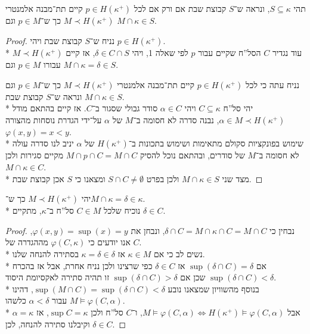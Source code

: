 \question{}
תהי $S \subseteq \kappa$, ונראה ש־$S$ קבוצת שבת אם ורק אם לכל $p \in H(\kappa^+)$ קיים תת־מבנה אלמנטרי $M \prec H(\kappa^+)$ כך ש־$p \in M$ וגם $M \cap \kappa \in S$.
\begin{proof}
	נניח ש־$S$ קבוצת שבת ויהי $p \in H(\kappa^+)$. \\*
	עוד נגדיר $C$ הסל''ח שקיים עבור $p$ לפי שאלה 1, ויהי $\delta \in C \cap S$, אז קיים $M \prec H(\kappa^+)$ עבורו $p \in M$ וגם $M \cap \kappa = \delta \in S$.

	נניח עתה כי לכל $p \in H(\kappa^+)$ קיים תת־מבנה אלמנטרי $M \prec H(\kappa^+)$ כך ש־$p \in M$ וגם $M \cap \kappa \in S$ ונראה ש־$S$ קבוצת שבת. \\*
	יהי סל''ח $C \subseteq \kappa$ ויהי $\alpha \in C$ סודר גבולי שסגור ב־$C$. אז קיים בהתאם מודל $\alpha \in M \prec H(\kappa^+)$, נבנה סדרה לא חסומה ב־$M$ של $\alpha$ על־ידי הגדרת נוסחות מהצורה $\varphi(x, y) = x < y$. \\*
	שימוש בפונקציות סקולם מתאימות ושימוש בתכונות ב־$H(\kappa^+)$ של $\alpha$ יניב לנו סדרה עולה לא חסומה ב־$M$ של סודרים, ובהתאם נוכל להסיק $M \cap p \cap C = M \cap C$ מקיים סגירות ולכן $M \cap \kappa \in C$. \\*
	מצד שני $M \cap \kappa \in S$ ולכן בפרט $S \cap C \ne \emptyset$ ומצאנו כי $S$ אכן קבוצת שבת.

\end{proof}

\question{}
יהי $M \prec H(\kappa^+)$ כך ש־$M \cap \kappa = \delta \in \kappa$. \\*
נוכיח שלכל $C \in M$ סל''ח ב־$\kappa$, מתקיים $\delta \in C$.
\begin{proof}
	נבחין כי $\delta \cap C = M \cap \kappa \cap C = M \cap C$, ונבחן את $\varphi(x, y) = \sup(x) = y$, אנו יודעים כי $\varphi(C, \kappa)$ מההגדרה של $C$. \\*
	נשים לב כי אם $\kappa \in M$ אז $\kappa = \delta \in \delta$ בסתירה להנחה שלנו. \\*
	אם $\sup(\delta \cap C) = \delta$ אז $\delta \in C$ כפי שרצינו ולכן נניח אחרת,
	אבל אז בהכרח $\sup(\delta \cap C) < \delta$ שכן אם $\sup(\delta \cap C) > \delta$ זו תהיה סתירה לאקסיומת היסוד. \\*
	בנוסף מהשוויון שמצאנו נובע $\sup(M \cap C) = \sup(\delta \cap C) < \delta$, דהינו $M \models \varphi(C, \alpha)$ עבור $\alpha < \delta$ כלשהו. \\*
	אבל $M \models \varphi(C, \alpha) \iff H(\kappa^+) \models \varphi(C, \alpha)$, ו־$C$ סל''ח ולכן $\sup C = \kappa$, אז $\alpha = \kappa$ וקיבלנו סתירה להנחה, לכן $\delta \in C$.
\end{proof}


